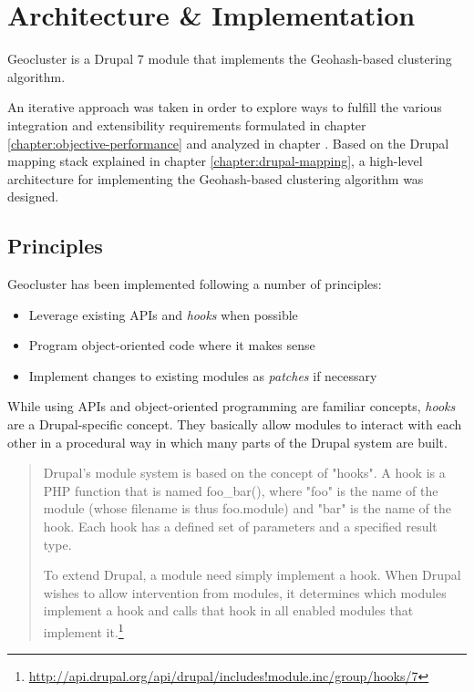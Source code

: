 
%
%

\section{Architecture \& Implementation}
\label{chapter:architecture-implementation}

Geocluster is a Drupal 7 module that implements the Geohash-based clustering algorithm. 
 
An iterative approach was taken in order to explore ways to fulfill the various integration and extensibility requirements formulated in chapter \ref{chapter:objective-performance} and analyzed in chapter \label{chapter:analysis-drupal}. Based on the Drupal mapping stack explained in chapter \ref{chapter:drupal-mapping}, a high-level architecture for implementing the Geohash-based clustering algorithm was designed.

\subsection{Principles}

Geocluster has been implemented following a number of principles:

\begin{itemize}

\item Leverage existing APIs and \textit{hooks} when possible
\item Program object-oriented code where it makes sense
\item Implement changes to existing modules as \textit{patches} if necessary

\end{itemize}

While using APIs and object-oriented programming are familiar concepts, \textit{hooks} are a Drupal-specific concept. They basically allow modules to interact with each other in a procedural way in which many parts of the Drupal system are built.

\begin{quote}
Drupal's module system is based on the concept of "hooks". A hook is a PHP function that is named foo\_bar(), where "foo" is the name of the module (whose filename is thus foo.module) and "bar" is the name of the hook. Each hook has a defined set of parameters and a specified result type.

To extend Drupal, a module need simply implement a hook. When Drupal wishes to allow intervention from modules, it determines which modules implement a hook and calls that hook in all enabled modules that implement it.\footnote{\url{http://api.drupal.org/api/drupal/includes!module.inc/group/hooks/7}}
\end{quote}

